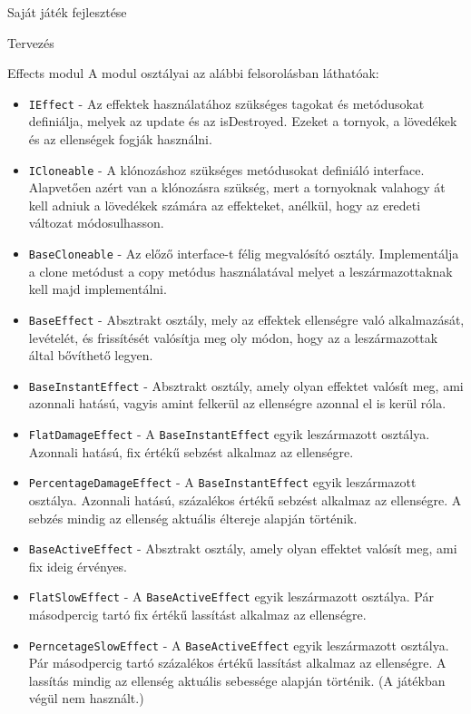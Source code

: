 \begin{MyChapter}{Saját játék fejlesztése}
\begin{MySection}{Tervezés}
\begin{MySubSection}{Effects modul}
			A modul osztályai az alábbi felsorolásban láthatóak:
			\begin{itemize}
				\item \texttt{IEffect} - Az effektek használatához szükséges tagokat és metódusokat definiálja, melyek az update és az isDestroyed. Ezeket a tornyok, a lövedékek és az ellenségek fogják használni.
				
				\item \texttt{ICloneable} - A klónozáshoz szükséges metódusokat definiáló interface. Alapvetően azért van a klónozásra szükség, mert a tornyoknak valahogy át kell adniuk a lövedékek számára az effekteket, anélkül, hogy az eredeti változat módosulhasson.

				\item \texttt{BaseCloneable} - Az előző interface-t félig megvalósító osztály. Implementálja a clone metódust a copy metódus használatával melyet a leszármazottaknak kell majd implementálni.

				\item \texttt{BaseEffect} - Absztrakt osztály, mely az effektek ellenségre való alkalmazását, levételét, és frissítését valósítja meg oly módon, hogy az a leszármazottak által bővíthető legyen.

				\item \texttt{BaseInstantEffect} - Absztrakt osztály, amely olyan effektet valósít meg, ami azonnali hatású, vagyis amint felkerül az ellenségre azonnal el is kerül róla.

				\item \texttt{FlatDamageEffect} - A \texttt{BaseInstantEffect} egyik leszármazott osztálya. Azonnali hatású, fix értékű sebzést alkalmaz az ellenségre.

				\item \texttt{PercentageDamageEffect} - A \texttt{BaseInstantEffect} egyik leszármazott osztálya. Azonnali hatású, százalékos értékű sebzést alkalmaz az ellenségre. A sebzés mindig az ellenség aktuális éltereje alapján történik.

				\item \texttt{BaseActiveEffect} - Absztrakt osztály, amely olyan effektet valósít meg, ami fix ideig érvényes.

				\item \texttt{FlatSlowEffect} - A \texttt{BaseActiveEffect} egyik leszármazott osztálya. Pár másodpercig tartó fix értékű lassítást alkalmaz az ellenségre.

				\item \texttt{PerncetageSlowEffect} - A \texttt{BaseActiveEffect} egyik leszármazott osztálya. Pár másodpercig tartó százalékos értékű lassítást alkalmaz az ellenségre. A lassítás mindig az ellenség aktuális sebessége alapján történik. (A játékban végül nem használt.)


\end{itemize}
\end{MySubSection}
\end{MySection}
\end{MyChapter}
